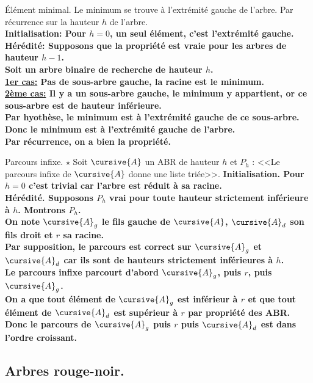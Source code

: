 \documentclass[french, 11pt]{article}
\begin{document}
\begin{prop}{Élément minimal.}{}
    Le minimum se trouve à l'extrémité gauche de l'arbre.
    \tcblower
    Par récurrence sur la hauteur $h$ de l'arbre.\\
    \bf{Initialisation:} Pour $h=0$, un seul élément, c'est l'extrémité gauche.\\
    \bf{Hérédité:} Supposons que la propriété est vraie pour les arbres de hauteur $h-1$.\\
    Soit un arbre binaire de recherche de hauteur $h$.\\
    \underline{1er cas:} Pas de sous-arbre gauche, la racine est le minimum.\\
    \underline{2ème cas:} Il y a un sous-arbre gauche, le minimum y appartient, or ce sous-arbre est de hauteur inférieure.\\
    Par hyothèse, le minimum est à l'extrémité gauche de ce sous-arbre.\\
    Donc le minimum est à l'extrémité gauche de l'arbre.\\
    Par récurrence, on a bien la propriété.
\end{prop}

\begin{prop}{Parcours infixe. $\star$}{}
    Soit $\cursive{A}$ un ABR de hauteur $h$ et $P_h$ : <<Le parcours infixe de $\cursive{A}$ donne une liste triée>>.
    \tcblower
    \bf{Initialisation.} Pour $h=0$ c'est trivial car l'arbre est réduit à sa racine.\\
    \bf{Hérédité.} Supposons $P_h$ vrai pour toute hauteur \bf{strictement} inférieure à $h$. Montrons $P_h$.\\
    On note $\cursive{A}_g$ le fils gauche de $\cursive{A}$, $\cursive{A}_d$ son fils droit et $r$ sa racine.\\
    Par supposition, le parcours est correct sur $\cursive{A}_g$ et $\cursive{A}_d$ car ils sont de hauteurs strictement inférieures à $h$.\\
    Le parcours infixe parcourt d'abord $\cursive{A}_g$, puis $r$, puis $\cursive{A}_g$.\\
    On a que tout élément de $\cursive{A}_g$ est inférieur à $r$ et que tout élément de $\cursive{A}_d$ est supérieur à $r$ par propriété des ABR.\\
    Donc le parcours de $\cursive{A}_g$ puis $r$ puis $\cursive{A}_d$ est dans l'ordre croissant.
\end{prop}

\subsection{Arbres rouge-noir.}
\end{document}
